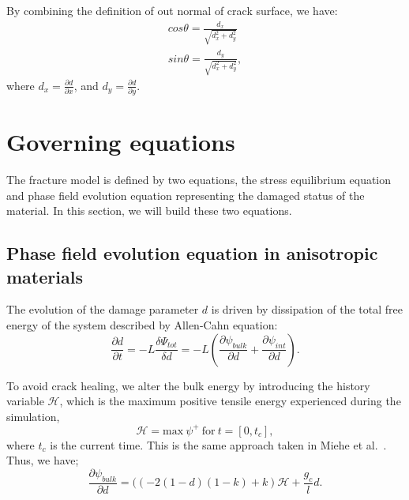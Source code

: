 \documentclass[3p,10pt,sort&compress]{elsarticle}
\begin{document}
By combining the definition of out normal of crack surface, we have:
\begin{eqnarray}
  cos\theta = \frac{d_x}{\sqrt {d_x^2+d_y^2}} \\
  sin\theta = \frac{d_y}{\sqrt {d_x^2+d_y^2}},
\end{eqnarray}
where $d_x = \frac{\partial d}{\partial x}$, and $d_y = \frac{\partial d}{\partial y}$.



\section{Governing equations}
The fracture model is defined by two equations, the stress equilibrium equation and phase field evolution equation representing the damaged status of the material. In this section, we will build these two equations.
\subsection{Phase field evolution equation in anisotropic materials}
The evolution of the damage parameter $d$ is driven by dissipation of the total free energy of the system described by Allen-Cahn equation:
\begin{equation}
	\frac{\partial d}{\partial t} = -L \frac{\delta \Psi_{tot}}{\delta d} = -L \left( \frac{\partial \psi_{bulk}}{\partial d} + \frac{\partial \psi_{int}}{\partial d} \right).
\end{equation}


To avoid crack healing, we alter the bulk energy by introducing the history variable $\mathcal{H}$, which is the maximum positive tensile energy experienced during the simulation,
\begin{equation}
\mathcal{H} = \mathrm{max}\ \psi^{+}  \ \mathrm{for}\  t=[0,t_c],
\end{equation}
where $t_c$ is the current time. This is the same approach taken in Miehe et al.\ \cite{miehe2010phase}. Thus, we have;
\begin{equation}
  \frac{\partial \psi_{bulk}}{\partial d} = ( (-2(1-d)(1-k) + k) \mathcal{H} + \frac{g_c}{l} d.
\end{equation}
\end{document}
